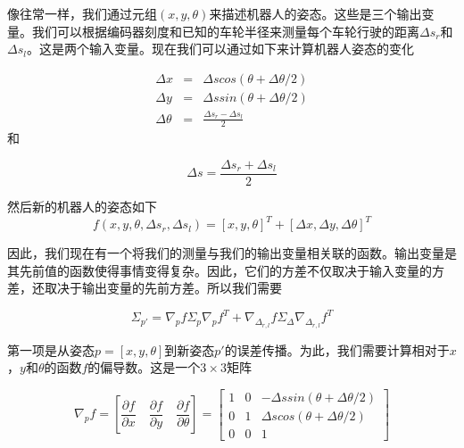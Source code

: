像往常一样，我们通过元组$(x,y,\theta)$来描述机器人的姿态。这些是三个输出变量。我们可以根据编码器刻度和已知的车轮半径来测量每个车轮行驶的距离$\Delta s_r$和$\Delta s_l$。这是两个输入变量。现在我们可以通过如下来计算机器人姿态的变化

\begin{eqnarray}
\Delta x  &=& \Delta s cos(\theta+\Delta \theta /2)\\
\Delta y  &=& \Delta s sin(\theta+\Delta \theta/2)\\
\Delta \theta &=& \frac{\Delta s_r-\Delta s_l}{2}
\end{eqnarray}
和

\begin{equation}
\Delta s=\frac{\Delta s_r + \Delta s_l}{2}
\end{equation}


然后新的机器人的姿态如下
\begin{equation}
f(x,y,\theta,\Delta s_r, \Delta s_l)=[x,y,\theta]^T + [\Delta x, \Delta y, \Delta \theta]^T
\end{equation}



因此，我们现在有一个将我们的测量与我们的输出变量相关联的函数。输出变量是其先前值的函数使得事情变得复杂。因此，它们的方差不仅取决于输入变量的方差，还取决于输出变量的先前方差。所以我们需要

\begin{equation}\label{eq:errorpropodom}
\Sigma_{p'}=\nabla_p f \Sigma_p \nabla_p f^T + \nabla_{\Delta_{r,l}}f \Sigma_{\Delta}\nabla_{\Delta_{r,l}}f^T
\end{equation}


第一项是从姿态$p=[x,y,\theta]$到新姿态$p'$的误差传播。为此，我们需要计算相对于$x$，$y$和$\theta$的函数$f$的偏导数。这是一个$3\times 3$矩阵

\begin{equation}
\nabla_p f=\left[\frac{\partial f}{\partial x} \quad \frac{\partial f}{\partial y} \quad \frac{\partial f}{\partial \theta}\right]=\left[\begin{array}{ccc}1 & 0 & -\Delta s sin(\theta +\Delta \theta /2)\\0 & 1 & \Delta s cos(\theta + \Delta \theta/2)\\0 & 0 &1\end{array}\right]
\end{equation}

